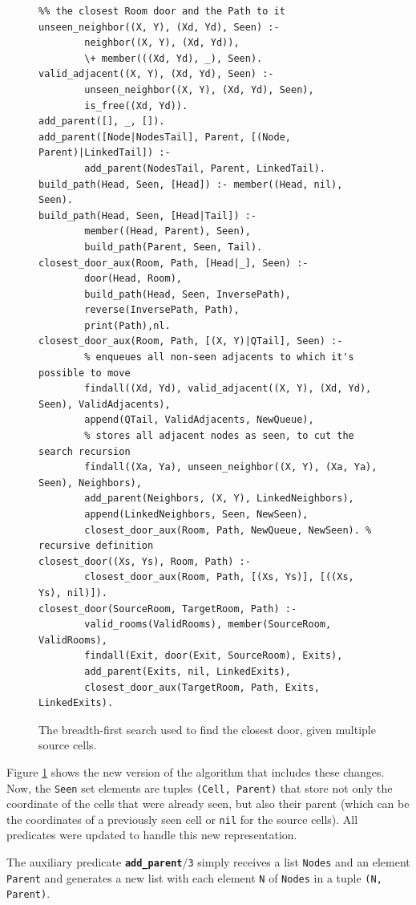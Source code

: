 \documentclass[12pt,a4paper]{article}
\newcommand{\varname}[1]{\texttt{#1}}
\newcommand{\varnamebf}[1]{\textbf{\texttt{#1}}}
\newcommand{\predprot}[2]{{\color{MidnightBlue}\varnamebf{#1}}/{\color{Mulberry}\varname{#2}}}
\begin{document}
\begin{figure}[H]
	\centering
\begin{lstlisting}[style=Prolog-pygsty]
%% closest_door((Xs, Ys), Room, Path) - starting at <Xs, Ys>, finds
%% the closest Room door and the Path to it
unseen_neighbor((X, Y), (Xd, Yd), Seen) :-
		neighbor((X, Y), (Xd, Yd)),
		\+ member(((Xd, Yd), _), Seen).
valid_adjacent((X, Y), (Xd, Yd), Seen) :-
		unseen_neighbor((X, Y), (Xd, Yd), Seen),
		is_free((Xd, Yd)).
add_parent([], _, []).
add_parent([Node|NodesTail], Parent, [(Node, Parent)|LinkedTail]) :-
		add_parent(NodesTail, Parent, LinkedTail).
build_path(Head, Seen, [Head]) :- member((Head, nil), Seen).
build_path(Head, Seen, [Head|Tail]) :-
		member((Head, Parent), Seen),
		build_path(Parent, Seen, Tail).
closest_door_aux(Room, Path, [Head|_], Seen) :-
		door(Head, Room),
		build_path(Head, Seen, InversePath),
		reverse(InversePath, Path),
		print(Path),nl.
closest_door_aux(Room, Path, [(X, Y)|QTail], Seen) :-
		% enqueues all non-seen adjacents to which it's possible to move
		findall((Xd, Yd), valid_adjacent((X, Y), (Xd, Yd), Seen), ValidAdjacents),
		append(QTail, ValidAdjacents, NewQueue),
		% stores all adjacent nodes as seen, to cut the search recursion
		findall((Xa, Ya), unseen_neighbor((X, Y), (Xa, Ya), Seen), Neighbors),
		add_parent(Neighbors, (X, Y), LinkedNeighbors),
		append(LinkedNeighbors, Seen, NewSeen),
		closest_door_aux(Room, Path, NewQueue, NewSeen). % recursive definition
closest_door((Xs, Ys), Room, Path) :-
		closest_door_aux(Room, Path, [(Xs, Ys)], [((Xs, Ys), nil)]).
closest_door(SourceRoom, TargetRoom, Path) :-
		valid_rooms(ValidRooms), member(SourceRoom, ValidRooms),
		findall(Exit, door(Exit, SourceRoom), Exits),
		add_parent(Exits, nil, LinkedExits),
		closest_door_aux(TargetRoom, Path, Exits, LinkedExits).
\end{lstlisting}
	\caption{The breadth-first search used to find the closest door, given multiple source cells.} 
	\label{fig:bfs-ms}
\end{figure}

Figure \ref{fig:bfs-ms} shows the new version of the algorithm that includes these changes. Now, the \varname{Seen} set elements are tuples \varname{(Cell, Parent)} that store not only the coordinate of the cells that were already seen, but also their parent (which can be the coordinates of a previously seen cell or \varname{nil} for the source cells). All predicates were updated to handle this new representation.

The auxiliary predicate \predprot{add\_parent}{3} simply receives a list \varname{Nodes} and an element \varname{Parent} and generates a new list with each element \varname{N} of \varname{Nodes} in a tuple \varname{(N, Parent)}.
\end{document}

